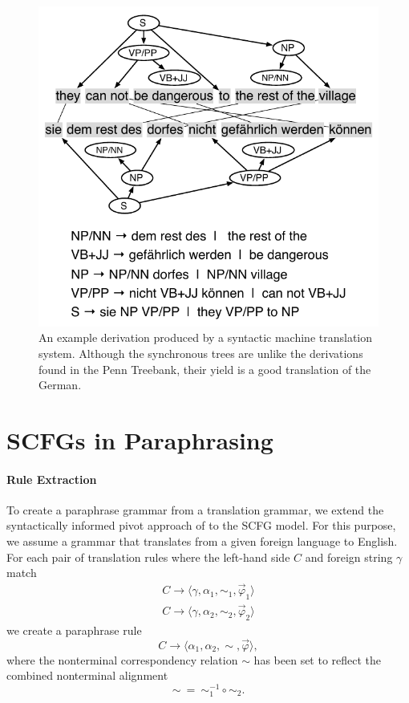 \documentclass[11pt]{article}
\begin{document}
\begin{figure}[t]
\begin{center}
\includegraphics[width=0.99\linewidth]{figures/example_translation.pdf}
\end{center}
\caption{An example derivation produced by a syntactic machine
  translation system.  Although the synchronous trees are unlike the
  derivations found in the Penn Treebank, their yield is a good
  translation of the German.}
\label{example_translation}
\end{figure}


\section{SCFGs in Paraphrasing} \label{acquisition}


\paragraph{Rule Extraction}

To create a paraphrase grammar from a translation grammar, we extend
the syntactically informed pivot approach of
 to the SCFG model. For this purpose, we
assume a grammar that translates from a given foreign language to
English. For each pair of translation rules where the left-hand side
$C$ and foreign string $\gamma$ match
\begin{eqnarray*}
  C \rightarrow \langle \gamma, \alpha_1, \sim_1, \vec{\varphi}_1 \rangle \\
  C \rightarrow \langle \gamma, \alpha_2, \sim_2, \vec{\varphi}_2 \rangle
\end{eqnarray*}
we create a paraphrase rule
\begin{equation*}
C \rightarrow \langle \alpha_1, \alpha_2, \sim, \vec{\varphi} \rangle ,
\end{equation*}
where the nonterminal correspondency relation $\sim$ has been set to
reflect the combined nonterminal alignment
\begin{equation*}
\sim ~ = ~ \sim_1^{-1} \circ \sim_2 .
\end{equation*}
\end{document}
